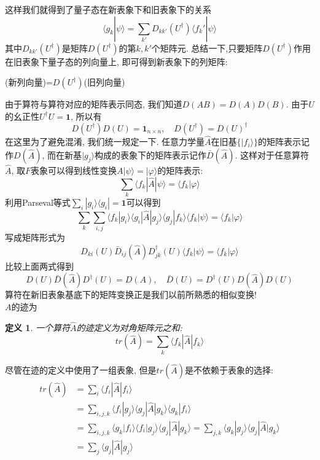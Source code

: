\documentclass[a4paper,11pt]{book}
\newtheorem{definition}{\hspace{2em}定义}[section]
\newcommand{\A}{\hat{A}}
\begin{document}
这样我们就得到了量子态在新表象下和旧表象下的关系
\begin{equation*}
  \langle g_k|\psi\rangle=\sum_{k'}D_{kk'}(U^\dag)\langle f_k'|\psi\rangle
\end{equation*}
其中$D_{kk'}(U^\dag)$是矩阵$D(U^\dag)$的第$k,k'$个矩阵元. 总结一下,只要矩阵$D(U^\dag)$作用在旧表象下量子态的列向量上, 即可得到新表象下的列矩阵:
\begin{center}
  (新列向量)=$D(U^\dag)$(旧列向量)
\end{center}
由于算符与算符对应的矩阵表示同态, 我们知道$D(AB)=D(A)D(B)$. 由于$U$的幺正性$U^\dag U=\mathbf{1}$, 所以有
\begin{equation*}
  D(U^\dag)D(U)=\mathbf{1}_{n\times n},\quad D(U^\dag)=D(U)^\dag
\end{equation*}
在这里为了避免混淆, 我们统一规定一下. 任意力学量$\A$在旧基$\{|f_i\rangle\}$的矩阵表示记作$D(\A)$, 而在新基$|g_j\rangle$构成的表象下的矩阵表示记作$\bar{D}(\A)$. 这样对于任意算符$\A$, 取$F$表象可以得到线性变换$A|\psi\rangle=|\varphi\rangle$的矩阵表示:
\begin{equation*}
  \sum_{k}\langle f_k|\A|\psi\rangle=\langle f_k|\varphi\rangle
\end{equation*}
利用Parseval等式$\sum_{i}|g_i\rangle\langle g_i|=\mathbf{1}$可以得到
\begin{equation*}
  \sum_{k}\sum_{i,j}\langle f_k|g_i\rangle\langle g_i|\A|g_j\rangle\langle g_j|f_k\rangle\langle f_k|\psi\rangle=\langle f_k|\varphi\rangle
\end{equation*}
写成矩阵形式为
\begin{equation*}
  D_{ki}(U)\bar{D}_{ij}(\A)D_{jk}^\dag(U)\langle f_k|\psi\rangle=\langle f_k|\varphi\rangle
\end{equation*}
比较上面两式得到
\begin{equation*}
  D(U)\bar{D}(\A)D^\dag(U)=D(A),\quad \bar{D}(U)=D^\dag(U)D(\A)D(U)
\end{equation*}
算符在新旧表象基底下的矩阵变换正是我们以前所熟悉的相似变换!\\
$A$的迹为
\begin{definition}
  一个算符$\A$的迹定义为对角矩阵元之和:
  \begin{equation*}
    tr(\A)=\sum_{k}\langle f_k|\A|f_k\rangle
  \end{equation*}
\end{definition}
尽管在迹的定义中使用了一组表象, 但是$tr(\A)$是不依赖于表象的选择:
\begin{equation*}
  \begin{split}
     tr(\A)&=\sum_{i}\langle f_i|\A|f_i\rangle\\
       &=\sum_{i,j,k}\langle f_i|g_j\rangle\langle g_j|\A|g_k\rangle\langle g_k|f_i\rangle\\
       &=\sum_{i,j,k}\langle g_k|f_i\rangle\langle f_i|g_j\rangle\langle g_j|\A|g_k\rangle=\sum_{j,k}\langle g_k|g_j\rangle\langle g_j|\A|g_k\rangle\\
       &=\sum_{j}\langle g_j|\A|g_j\rangle
  \end{split}
\end{equation*}
\end{document}
